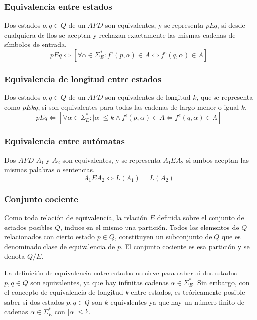 \documentclass[12pt]{article}
\begin{document}
\subsubsection{Equivalencia entre estados}
Dos estados $ p,q \in Q $ de un $ AFD $ son equivalentes, y se representa $ pEq $, si desde cualquiera de llos se aceptan y rechazan exactamente las mismas cadenas de símbolos de entrada.
\[
pEq \iff \left[ \forall \alpha \in \Sigma_{E}^{*}: f^{e}(p,\alpha) \in A \iff f^{e}(q,\alpha) \in A\right]
\]

\subsubsection{Equivalencia de longitud entre estados}
Dos estados $ p,q \in Q $ de un $ AFD $ son equivalentes de longitud $ k $, que se representa como $ pEkq $, si son equivalentes para todas las cadenas de largo menor o igual $ k $.
\[
pEq \iff \left[ \forall \alpha \in \Sigma_{E}^{*}: \left|\alpha\right|\leq k \land f^{e}(p,\alpha) \in A \iff f^{e}(q,\alpha) \in A\right]
\]

\subsubsection{Equivalencia entre autómatas}
Dos $ AFD $ $ A_{1} $ y $ A_{2} $ son equivalentes, y se representa $ A_{1}EA_{2} $ si ambos aceptan las mismas palabras o sentencias.
\[
A_{1}EA_{2} \iff L(A_{1}) = L(A_{2})
\]

\subsubsection{Conjunto cociente}
Como toda relación de equivalencía, la relación $ E $ definida sobre el conjunto de estados posibles $ Q $, induce en el mismo una partición. Todos los elementos de $ Q $ relacionados con cierto estado $ p \in Q $, constituyen un subconjunto de $ Q $ que es denominado clase de equivalencia de $ p $. El conjunto cociente es esa partición y se denota $ Q/E $.

La definición de equivalencia entre estados no sirve para saber si dos estados $ p,q \in Q $ son equivalentes, ya que hay infinitas cadenas $ \alpha \in \Sigma_{E}^{*} $. Sin embargo, con el concepto de equivalencia de longitud $ k $ entre estados, es teóricamente posible saber si dos estados $ p,q \in Q $ son $ k $-equivalentes ya que hay un número finito de cadenas $ \alpha \in \Sigma_{E}^{*} $ con $ \left|\alpha\right|\leq k $.
\end{document}
